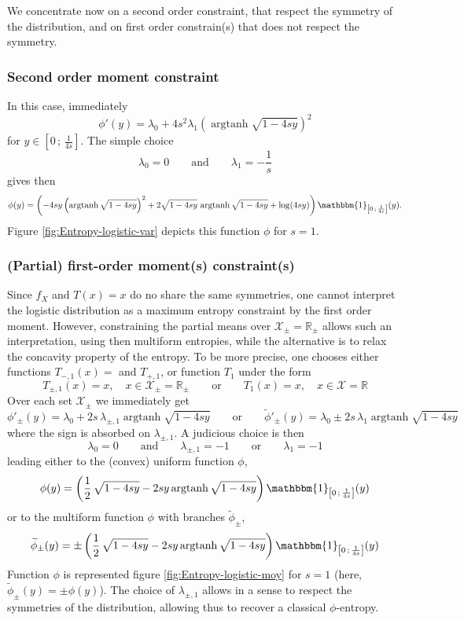 \documentclass[english,onecolumn]{elsarticle}
\def\Rset{\mathbb{R}}
\def\X{\mathcal{X}}
\def\un{\mathbbm{1}}
\def\argtanh{\operatorname{argtanh}}
\begin{document}
We concentrate  now on a second  order constraint, that respect  the symmetry of
the  distribution, and on  first order  constrain(s) that  does not  respect the
symmetry.



\subsubsection{Second order moment constraint}

In this case, immediately
%
\[
\phi'(y) = \lambda_0 + 4 s^2 \lambda_1 \left( \argtanh \sqrt{1 - 4 s y}
\right)^2
\]
%
for $y \in \left[ 0 \, ; \,  \frac{1}{4s} \right]$. The simple choice
%
\[
\lambda_0 = 0 \qquad \mbox{and} \qquad \lambda_1 = - \frac{1}{s}
\]
%
gives then
%
\[
\phi(y) = \left( - 4 s y \left( \argtanh \sqrt{1-4 s y} \right)^2 + 2
\sqrt{1-4sy} \, \argtanh \sqrt{1-4 s y} + \log (4 s y) \right) \un_{\left[ 0 \,
; \, \frac{1}{4 s} \right]}(y).
\]
%
Figure \ref{fig:Entropy-logistic-var} depicts this function $\phi$ for $s = 1$.



\subsubsection{(Partial) first-order moment(s) constraint(s)}

Since $f_X$ and $T(x) = x$ do no share the same symmetries, one cannot interpret
the logistic  distribution as  a maximum entropy  constraint by the  first order
moment.   However, constraining  the  partial means  over  $\X_\pm =  \Rset_\pm$
allows  such  an  interpretation,  using  then multiform  entropies,  while  the
alternative  is to  relax the  concavity  property of  the entropy.  To be  more
precise, one chooses either functions $T_{-,1}(x) = $ and $T_{+,1}$, or function
$T_1$ under the form
%
\[
T_{\pm,1}(x) = x, \quad x \in \X_\pm = \Rset_\pm \qquad \mbox{or} \qquad T_1(x)
= x, \quad x \in \X = \Rset
\]
%
Over each set $\X_\pm$ we immediately get
%
\[
\phi'_\pm(y) = \lambda_0 + 2 s \, \lambda_{\pm,1} \argtanh \sqrt{1-4 s y} \qquad
\mbox{or} \qquad \widetilde{\phi}'_\pm(y) = \lambda_0 \pm 2 s \, \lambda_1
\argtanh \sqrt{1-4 s y}
\]
%
where the sign is absorbed on $\lambda_{\pm,1}$. A judicious choice is then
%
\[
\lambda_0 = 0 \qquad \mbox{and} \qquad \lambda_{\pm,1} = -1 \qquad \mbox{or}
\qquad \lambda_1 = -1
\]
%
leading either to the (convex) uniform function $\phi$,
\[
\phi(y) = \left( \frac12 \, \sqrt{1 - 4 s y} - 2 s y \argtanh \sqrt{1 - 4 s y}
\right) \un_{\left[ 0 \, ; \, \frac{1}{4 s} \right]}(y)
\]
%
or to the multiform function $\phi$ with branches $\widetilde{\phi}_\pm$,
\[
\widetilde{\phi}_\pm(y) = \pm \left( \frac12 \, \sqrt{1 - 4 s y} - 2 s y \argtanh
\sqrt{1 - 4 s y} \right) \un_{\left[ 0 \, ; \, \frac{1}{4 s} \right]}(y)
\]
%
Function $\phi$ is represented figure \ref{fig:Entropy-logistic-moy} for $s = 1$
(here, $\widetilde{\phi}_\pm(y) = \pm \phi(y)$). 
The choice  of $\lambda_{\pm,1}$ allows in  a sense to respect  the symmetries of
the distribution, allowing thus to recover a classical $\phi$-entropy.
\end{document}
